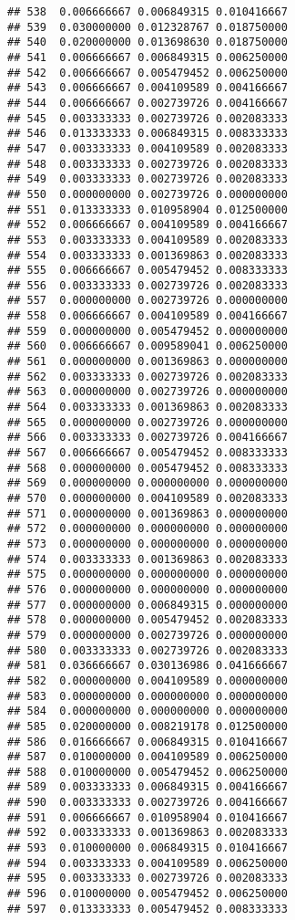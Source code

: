 \documentclass[
]{article}
\begin{document}
\begin{verbatim}
## 538  0.006666667 0.006849315 0.010416667
## 539  0.030000000 0.012328767 0.018750000
## 540  0.020000000 0.013698630 0.018750000
## 541  0.006666667 0.006849315 0.006250000
## 542  0.006666667 0.005479452 0.006250000
## 543  0.006666667 0.004109589 0.004166667
## 544  0.006666667 0.002739726 0.004166667
## 545  0.003333333 0.002739726 0.002083333
## 546  0.013333333 0.006849315 0.008333333
## 547  0.003333333 0.004109589 0.002083333
## 548  0.003333333 0.002739726 0.002083333
## 549  0.003333333 0.002739726 0.002083333
## 550  0.000000000 0.002739726 0.000000000
## 551  0.013333333 0.010958904 0.012500000
## 552  0.006666667 0.004109589 0.004166667
## 553  0.003333333 0.004109589 0.002083333
## 554  0.003333333 0.001369863 0.002083333
## 555  0.006666667 0.005479452 0.008333333
## 556  0.003333333 0.002739726 0.002083333
## 557  0.000000000 0.002739726 0.000000000
## 558  0.006666667 0.004109589 0.004166667
## 559  0.000000000 0.005479452 0.000000000
## 560  0.006666667 0.009589041 0.006250000
## 561  0.000000000 0.001369863 0.000000000
## 562  0.003333333 0.002739726 0.002083333
## 563  0.000000000 0.002739726 0.000000000
## 564  0.003333333 0.001369863 0.002083333
## 565  0.000000000 0.002739726 0.000000000
## 566  0.003333333 0.002739726 0.004166667
## 567  0.006666667 0.005479452 0.008333333
## 568  0.000000000 0.005479452 0.008333333
## 569  0.000000000 0.000000000 0.000000000
## 570  0.000000000 0.004109589 0.002083333
## 571  0.000000000 0.001369863 0.000000000
## 572  0.000000000 0.000000000 0.000000000
## 573  0.000000000 0.000000000 0.000000000
## 574  0.003333333 0.001369863 0.002083333
## 575  0.000000000 0.000000000 0.000000000
## 576  0.000000000 0.000000000 0.000000000
## 577  0.000000000 0.006849315 0.000000000
## 578  0.000000000 0.005479452 0.002083333
## 579  0.000000000 0.002739726 0.000000000
## 580  0.003333333 0.002739726 0.002083333
## 581  0.036666667 0.030136986 0.041666667
## 582  0.000000000 0.004109589 0.000000000
## 583  0.000000000 0.000000000 0.000000000
## 584  0.000000000 0.000000000 0.000000000
## 585  0.020000000 0.008219178 0.012500000
## 586  0.016666667 0.006849315 0.010416667
## 587  0.010000000 0.004109589 0.006250000
## 588  0.010000000 0.005479452 0.006250000
## 589  0.003333333 0.006849315 0.004166667
## 590  0.003333333 0.002739726 0.004166667
## 591  0.006666667 0.010958904 0.010416667
## 592  0.003333333 0.001369863 0.002083333
## 593  0.010000000 0.006849315 0.010416667
## 594  0.003333333 0.004109589 0.006250000
## 595  0.003333333 0.002739726 0.002083333
## 596  0.010000000 0.005479452 0.006250000
## 597  0.013333333 0.005479452 0.008333333

\end{verbatim}
\end{document}
